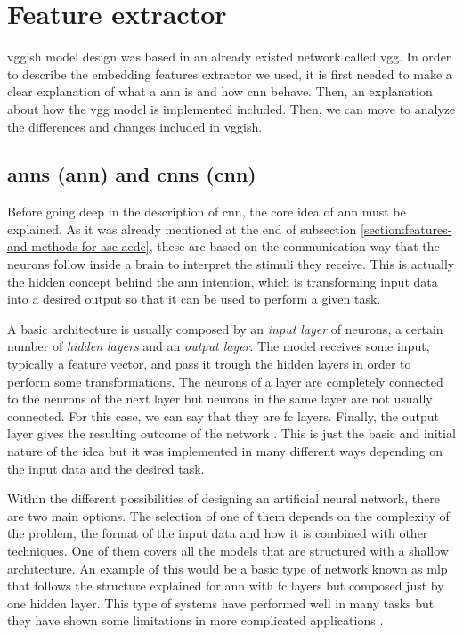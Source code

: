 \section{Feature extractor}
\label{section:feature-extractor}

	\acrshort{vgg}ish model design was based in an already existed network called \acrshort{vgg}. In order to describe the embedding features extractor we used, it is first needed to make a clear explanation of what a \acrlong{ann} is and how \acrlong{cnn} behave. Then, an explanation about how the \acrshort{vgg} model is implemented included. Then, we can move to analyze the differences and changes included in \acrshort{vgg}ish. 

\subsection{\acrlong{ann}s (\acrshort{ann}) and \acrlong{cnn}s (\acrshort{cnn})}
\label{subsection:ann-cnn}

	Before going deep in the description of \acrshort{cnn}, the core idea of \acrshort{ann} must be explained. As it was already mentioned at the end of subsection \ref{section:features-and-methods-for-asc-aedc}, these are based on the communication way that the neurons follow inside a brain to interpret the stimuli they receive. This is actually the hidden concept behind the \acrshort{ann} intention, which is transforming input data into a desired output so that it can be used to perform a given task. %

	A basic architecture is usually composed by an \textit{input layer} of neurons, a certain number of \textit{hidden layers} and an \textit{output layer}. The model receives some input, typically a feature vector, and pass it trough the hidden layers in order to perform some transformations. The neurons of a layer are completely connected to the neurons of the next layer but neurons in the same layer are not usually connected. For this case, we can say that they are \acrfull{fc} layers. Finally, the output layer gives the resulting outcome of the network \cite{Kwon2011}. This is just the basic and initial nature of the idea but it was implemented in many different ways depending on the input data and the desired task.

	Within the different possibilities of designing an artificial neural network, there are two main options. The selection of one of them depends on the complexity of the problem, the format of the input data and how it is combined with other techniques. One of them covers all the models that are structured with a shallow architecture. An example of this would be a basic type of network known as \acrfull{mlp} that follows the structure explained for \acrshort{ann} with \acrlong{fc} layers but composed just by one hidden layer. This type of systems have performed well in many tasks but they have shown some limitations in more complicated applications \cite{Deng2014}.


